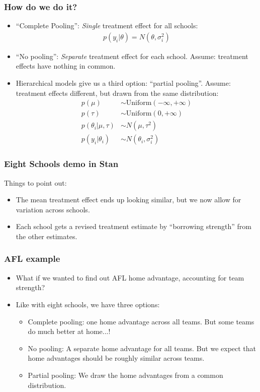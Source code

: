 \documentclass{beamer}
\begin{document}
\begin{frame}
	\frametitle{How do we do it?}
	\begin{itemize}
		\item ``Complete Pooling'': \emph{Single} treatment effect for all schools:
		\begin{align*}
			p(y_i | \theta) = N(\theta, \sigma_i^2)	
		\end{align*}
		\item ``No pooling'': \emph{Separate} treatment effect for each school. Assume: treatment effects have nothing in common.
		\item Hierarchical models give us a third option: ``partial pooling''. Assume: treatment effects different, but drawn from the same distribution:
		\begin{align*}
			p(\mu) & \sim \textrm{Uniform}(-\infty, +\infty) \\
			p(\tau) & \sim \textrm{Uniform}(0, +\infty) \\
			p(\theta_i | \mu, \tau) & \sim N(\mu, \tau^2) \\
			p(y_i | \theta_i) & \sim N(\theta_i, \sigma_i^2)
		\end{align*}
	\end{itemize}
\end{frame}

\begin{frame}[fragile]
\frametitle{Eight Schools demo in Stan}
Things to point out:
\begin{itemize}
	\item The mean treatment effect ends up looking similar, but we now allow for variation across schools.
	\item Each school gets a revised treatment estimate by ``borrowing strength'' from the other estimates.
\end{itemize}
\end{frame}

\begin{frame}
	\frametitle{AFL example}
	\begin{itemize}
		\item What if we wanted to find out AFL home advantage, accounting for team strength?
		\item Like with eight schools, we have three options:
		\begin{itemize}
			\item Complete pooling: one home advantage across all teams. But some teams do much better at home...!
			\item No pooling: A separate home advantage for all teams. But we expect that home advantages should be roughly similar across teams.
			\item Partial pooling: We draw the home advantages from a common distribution.
		\end{itemize}
	\end{itemize}
\end{frame}
\end{document}
